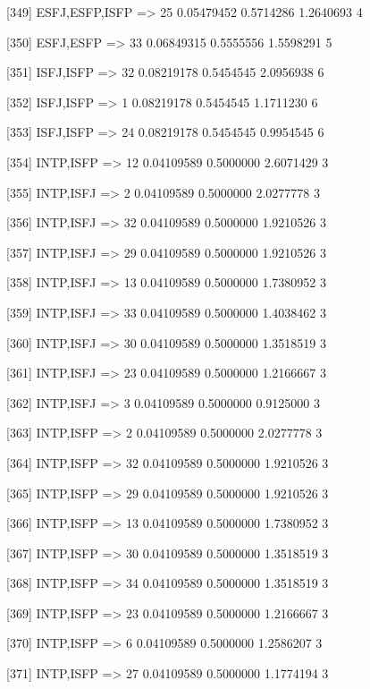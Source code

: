 [349] {ESFJ,ESFP,ISFP}      => {25} 0.05479452 0.5714286  1.2640693  4   

[350] {ESFJ,ESFP}           => {33} 0.06849315 0.5555556  1.5598291  5   

[351] {ISFJ,ISFP}           => {32} 0.08219178 0.5454545  2.0956938  6   

[352] {ISFJ,ISFP}           => {1}  0.08219178 0.5454545  1.1711230  6   

[353] {ISFJ,ISFP}           => {24} 0.08219178 0.5454545  0.9954545  6   

[354] {INTP,ISFP}           => {12} 0.04109589 0.5000000  2.6071429  3   

[355] {INTP,ISFJ}           => {2}  0.04109589 0.5000000  2.0277778  3   

[356] {INTP,ISFJ}           => {32} 0.04109589 0.5000000  1.9210526  3   

[357] {INTP,ISFJ}           => {29} 0.04109589 0.5000000  1.9210526  3   

[358] {INTP,ISFJ}           => {13} 0.04109589 0.5000000  1.7380952  3   

[359] {INTP,ISFJ}           => {33} 0.04109589 0.5000000  1.4038462  3   

[360] {INTP,ISFJ}           => {30} 0.04109589 0.5000000  1.3518519  3   

[361] {INTP,ISFJ}           => {23} 0.04109589 0.5000000  1.2166667  3   

[362] {INTP,ISFJ}           => {3}  0.04109589 0.5000000  0.9125000  3   

[363] {INTP,ISFP}           => {2}  0.04109589 0.5000000  2.0277778  3   

[364] {INTP,ISFP}           => {32} 0.04109589 0.5000000  1.9210526  3   

[365] {INTP,ISFP}           => {29} 0.04109589 0.5000000  1.9210526  3   

[366] {INTP,ISFP}           => {13} 0.04109589 0.5000000  1.7380952  3   

[367] {INTP,ISFP}           => {30} 0.04109589 0.5000000  1.3518519  3   

[368] {INTP,ISFP}           => {34} 0.04109589 0.5000000  1.3518519  3   

[369] {INTP,ISFP}           => {23} 0.04109589 0.5000000  1.2166667  3   

[370] {INTP,ISFP}           => {6}  0.04109589 0.5000000  1.2586207  3   

[371] {INTP,ISFP}           => {27} 0.04109589 0.5000000  1.1774194  3   

